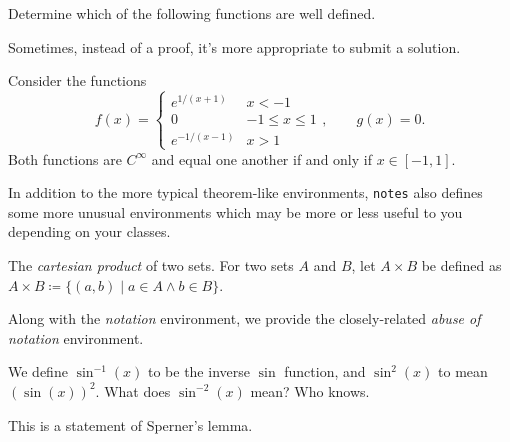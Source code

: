 \documentclass[code]{notes}
\begin{document}
	\begin{problem}[Szemerédi, p. 42]
		Determine which of the following functions are well defined.
		\begin{parts}\relax
			\part\relax $f(a/b) = a$;
			\part\relax $f(a/b) = a^2/b^2$.
		\end{parts}
	\end{problem}
	\begin{solution}
		Sometimes, instead of a proof, it's more appropriate to submit a solution.
	\end{solution}
	\begin{example}
		Consider the functions 
		\[ f(x) = \begin{cases}
						e^{1/(x+1)} & x < -1 \\
						0 & -1 \leq x \leq 1 \\
						e^{-1/(x-1)} & x > 1
		           \end{cases},\qquad g(x) = 0. \]
		Both functions are $C^\infty$ and equal one another if and only if $x \in [-1,1]$.
	\end{example}
	In addition to the more typical theorem-like environments, \texttt{notes} also defines some more unusual environments which may be more or less useful to you depending on your classes.
	\begin{notation}[$\times$]
		The \emph{cartesian product} of two sets. For two sets $A$ and $B$, let $A \times B$ be defined as $A \times B \coloneqq \{(a,b) \mid a \in A \land b \in B\}$.
	\end{notation}
	Along with the \emph{notation} environment, we provide the closely-related \emph{abuse of notation} environment.
	\begin{abuse}
		We define $\sin^{-1}(x)$ to be the inverse $\sin$ function, and $\sin^2(x)$ to mean $(\sin(x))^2$. What does $\sin^{-2}(x)$ mean? Who knows.
	\end{abuse}

	\begin{lemma}[Sperner's]
		This is a statement of Sperner's lemma.
	\end{lemma}
\end{document}
